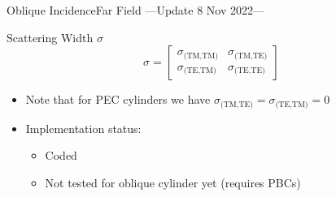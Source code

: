 \begin{frame}[allowframebreaks]{Oblique Incidence}{Far Field
    ---{Update 8 Nov 2022}---}
\begin{enumerate}
    \end{enumerate}
    
    \framebreak %

    \begin{block}{Scattering Width $\sigma$}
      \begin{equation*}
        \sigma =
        \begin{bmatrix}
          \sigma_{\text{(TM,TM)}} & \sigma_{\text{(TM,TE)}} \\
          \sigma_{\text{(TE,TM)}} & \sigma_{\text{(TE,TE)}} 
        \end{bmatrix}
      \end{equation*}

      \begin{itemize}
      \item Note that for PEC cylinders we have
        $\sigma_{\text{(TM,TE)}}=\sigma_{\text{(TE,TM)}}=0$
      \end{itemize}
      
    \end{block}


    \vspace{\baselineskip}
   
    
    \begin{itemize}
    \item Implementation status:
      \begin{itemize}
      \item Coded
      \item Not tested for oblique cylinder yet (requires PBCs)
      \end{itemize}
    \end{itemize}
    
\end{frame}
  

